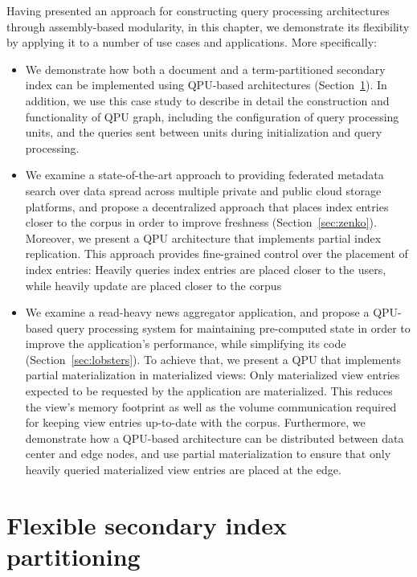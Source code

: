 Having presented an approach for constructing query processing architectures through assembly-based modularity,
in this chapter, we demonstrate its flexibility by applying it to a number of use cases and applications.
More specifically:

\begin{itemize}
  \item We demonstrate how both a document and a term-partitioned secondary
  index can be implemented using QPU-based architectures (Section~\ref{sec:cs_index_partitioning}).
  In addition,
  we use this case study to describe in detail the construction and functionality of QPU graph,
  including the configuration of query processing units, and the queries sent between units
  during initialization and query processing.

  \item We examine a state-of-the-art approach to providing federated metadata search over data spread
  across multiple private and public cloud storage platforms,
  and propose a decentralized approach that places index entries closer to the corpus in order to improve
  freshness (Section~\ref{sec:zenko}).
  Moreover, we present a QPU architecture that implements partial index replication.
  This approach provides fine-grained control over the placement of index entries:
  Heavily queries index entries are placed closer to the users,
  while heavily update are placed closer to the corpus

  \item We examine a read-heavy news aggregator application,
  and propose a QPU-based query processing system for maintaining pre-computed state in order to improve the application's performance,
  while simplifying its code (Section~\ref{sec:lobsters}).
  To achieve that, we present a QPU that implements partial materialization in materialized views:
  Only materialized view entries expected to be requested by the application are materialized.
  This reduces the view's memory footprint as well as the volume communication required for keeping view entries up-to-date
  with the corpus.
  Furthermore, we demonstrate how a QPU-based architecture can be distributed between data center and edge nodes,
  and use partial materialization to ensure that only heavily queried materialized view entries are placed at the edge.
\end{itemize}

\section{Flexible secondary index partitioning}
\label{sec:cs_index_partitioning}

